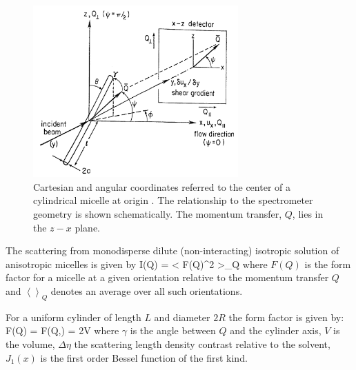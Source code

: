 \begin{figure}[htb]
\begin{center}
\includegraphics[width=0.7\textwidth]{shear_cuette_SANS_geometry.png}
\end{center}
\caption{Cartesian and angular coordinates referred to the center
of a cylindrical micelle at origin \cite{Hayter1984}. The relationship to the
spectrometer geometry is shown schematically. The momentum
transfer, $Q$, lies in the $z-x$ plane.}
\label{shear_cuette_SANS_geometry}
\end{figure}

The scattering from monodisperse dilute (non-interacting)
isotropic solution of anisotropic micelles is given by \cite{Hayter1984}
\BE 
I(Q) =
\left< \vert F(Q)\vert^2 \right>_Q \label{IQ_av} 
\EE 
where $F(Q)$
is the form factor for a micelle at a given orientation relative
to the momentum transfer $Q$ and $\left<\right>_Q$ denotes an
average over all such orientations.

For a uniform cylinder of length $L$ and diameter $2R$ the form
factor is given by:
\BE F(Q) = F(Q,\gamma) = 2\Delta\eta V
\EE
where $\gamma$ is the
angle between $Q$ and the cylinder axis, $V$ is the volume,
$\Delta\eta$ the scattering length density contrast relative to
the solvent, $J_1(x)$ is the first order Bessel function of the
first kind.

